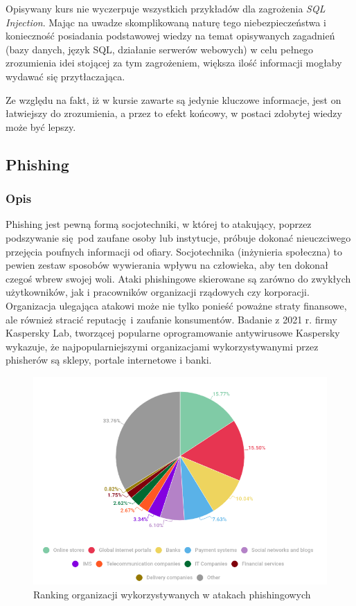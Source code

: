 \documentclass[12pt,twoside]{article}
\begin{document}
Opisywany kurs nie wyczerpuje wszystkich przykładów dla zagrożenia \emph{SQL Injection}. Mając na uwadze skomplikowaną naturę tego niebezpieczeństwa i konieczność posiadania podstawowej wiedzy na temat opisywanych zagadnień (bazy danych, język SQL, działanie serwerów webowych) w celu pełnego zrozumienia idei stojącej za tym zagrożeniem, większa ilość informacji mogłaby wydawać się przytłaczająca. 

Ze względu na fakt, iż w kursie zawarte są jedynie kluczowe informacje, jest on łatwiejszy do zrozumienia, a przez to efekt końcowy, w postaci zdobytej wiedzy może być lepszy.

\clearpage

\subsection{Phishing}
\subsubsection{Opis}
Phishing jest pewną formą socjotechniki, w której to atakujący, poprzez podszywanie się pod zaufane osoby lub instytucje, próbuje dokonać nieuczciwego przejęcia poufnych informacji od ofiary. Socjotechnika (inżynieria społeczna) to pewien zestaw sposobów wywierania wpływu na człowieka, aby ten dokonał czegoś wbrew swojej woli. Ataki phishingowe skierowane są zarówno do zwykłych użytkowników, jak i pracowników organizacji rządowych czy korporacji. Organizacja ulegająca atakowi może nie tylko ponieść poważne straty finansowe, ale również stracić reputację i zaufanie konsumentów. Badanie z 2021 r. firmy Kaspersky Lab, tworzącej popularne oprogramowanie antywirusowe Kaspersky wykazuje, że najpopularniejszymi organizacjami wykorzystywanymi przez phisherów są sklepy, portale internetowe i banki.  \cite{PhishingChart}	

\begin{figure}[H]
	\centering
	\includegraphics[width=0.9\linewidth]{figures/phishing-organisations}
	\caption{Ranking organizacji wykorzystywanych w atakach phishingowych \cite{PhishingRanking}}
	\label{fig:phishing-organisations}
\end{figure}
\end{document}
